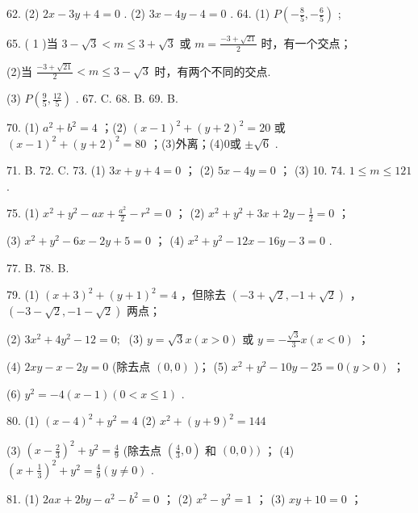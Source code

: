 \documentclass[10pt]{article}
\begin{document}
62. (2) \({2x} - {3y} + 4 = 0\) . (2) \({3x} - {4y} - 4 = 0\) . 64. (1) \(P\left( {-\frac{8}{5}, - \frac{6}{5}}\right)\) ;

65. ( 1 )当 \(3 - \sqrt{3} < m \leq  3 + \sqrt{3}\) 或 \(m = \frac{-3 + \sqrt{21}}{2}\) 时，有一个交点；

(2)当 \(\frac{-3 + \sqrt{21}}{2} < m \leq  3 - \sqrt{3}\) 时，有两个不同的交点.

(3) \(P\left( {\frac{9}{5},\frac{12}{5}}\right)\) . 67. C. 68. B. 69. B.

70. (1) \({a}^{2} + {b}^{2} = 4\) ；(2) \({\left( x - 1\right) }^{2} + {\left( y + 2\right) }^{2} = {20}\) 或 \({\left( x - 1\right) }^{2} + {\left( y + 2\right) }^{2} = {80}\) ；(3)外离；(4)0或 \(\pm  \sqrt{6}\) .

71. B. 72. C. 73. (1) \({3x} + y + 4 = 0\) ； (2) \({5x} - {4y} = 0\) ； (3) 10. 74. \(1 \leq  m \leq  {121}\) .

75. (1) \({x}^{2} + {y}^{2} - {ax} + \frac{{a}^{2}}{2} - {r}^{2} = 0\) ； (2) \({x}^{2} + {y}^{2} + {3x} + {2y} - \frac{1}{2} = 0\) ；

(3) \({x}^{2} + {y}^{2} - {6x} - {2y} + 5 = 0\) ； (4) \({x}^{2} + {y}^{2} - {12x} - {16y} - 3 = 0\) .

77. B. 78. B.

79. (1) \({\left( x + 3\right) }^{2} + {\left( y + 1\right) }^{2} = 4\) ，但除去 \(\left( {-3 + \sqrt{2}, - 1 + \sqrt{2}}\right)\) ， \(\left( {-3 - \sqrt{2}, - 1 - \sqrt{2}}\right)\) 两点；

(2) \(3{x}^{2} + 4{y}^{2} - {12} = 0;\;\) (3) \(y = \sqrt{3}x\left( {x > 0}\right)\) 或 \(y =  - \frac{\sqrt{3}}{3}x\left( {x < 0}\right)\) ；

(4) \({2xy} - x - {2y} = 0\) (除去点 \(\left( {0,0}\right)\) )； (5) \({x}^{2} + {y}^{2} - {10y} - {25} = 0\left( {y > 0}\right)\) ；

(6) \({y}^{2} =  - 4\left( {x - 1}\right) \left( {0 < x \leq  1}\right)\) .

80. (1) \({\left( x - 4\right) }^{2} + {y}^{2} = 4\) (2) \({x}^{2} + {\left( y + 9\right) }^{2} = {144}\)

(3) \({\left( x - \frac{2}{3}\right) }^{2} + {y}^{2} = \frac{4}{9}\) (除去点 \(\left( {\frac{4}{3},0}\right)\) 和 \(\left( {0,0}\right) )\) ； (4) \({\left( x + \frac{1}{3}\right) }^{2} + {y}^{2} = \frac{4}{9}\left( {y \neq  0}\right)\) .

81. (1) \({2ax} + {2by} - {a}^{2} - {b}^{2} = 0\) ； (2) \({x}^{2} - {y}^{2} = 1\) ； (3) \({xy} + {10} = 0\) ；
\end{document}
